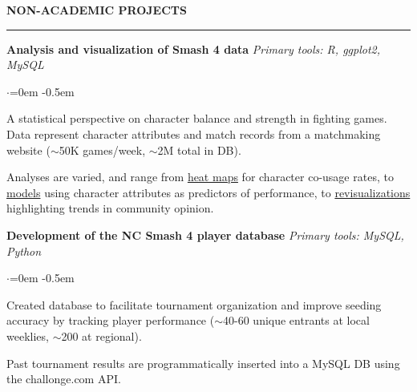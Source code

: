 \documentclass[11pt]{article}
\newenvironment{rSection}[1]{ %
  \sectionskip
  \MakeUppercase{\bf #1} %
  \sectionlineskip
  \hrule %
  \begin{list}{}{ %
    \setlength{\leftmargin}{1.5em} %
  }
  \item[]
}{
  \end{list}
}
\def\sectionlineskip{\smallskip} %
\def\sectionskip{\smallskip} %
\begin{document}
\begin{rSection}{Non-academic projects}

\textbf{Analysis and visualization of Smash 4 data} \hfill \textit{Primary tools: R, ggplot2, MySQL} \\
\begin{list}{$\cdot$}{\leftmargin=0em} 
   \itemsep -0.5em \vspace{-2.0em} 
   \item A statistical perspective on character balance and strength in fighting games. Data represent character attributes and match records from a matchmaking website ($\sim$50K games/week, $\sim$2M total in DB).
   \item Analyses are varied, and range from \href{https://dl.dropboxusercontent.com/u/42186570/char_co-usage_icons.png}{heat maps} for character co-usage rates, to \href{https://dl.dropboxusercontent.com/u/42186570/4BR_v_runspeed_nozoom.png}{models} using character attributes as predictors of performance, to \href{https://dl.dropboxusercontent.com/u/42186570/4br-1.1.6-sorted-deltas.png}{revisualizations} highlighting trends in community opinion.
\end{list}

\vspace{-0.2ex}
\textbf{Development of the NC Smash 4 player database} \hfill \textit{Primary tools: MySQL, Python} \\
\begin{list}{$\cdot$}{\leftmargin=0em} 
   \itemsep -0.5em \vspace{-2.0em} 
   \item Created database to facilitate tournament organization and improve seeding accuracy by tracking player performance ($\sim$40-60 unique entrants at local weeklies, $\sim$200 at regional). %
   \item Past tournament results are programmatically inserted into a MySQL DB using the challonge.com API.
\end{list}

\end{rSection}
\end{document}
